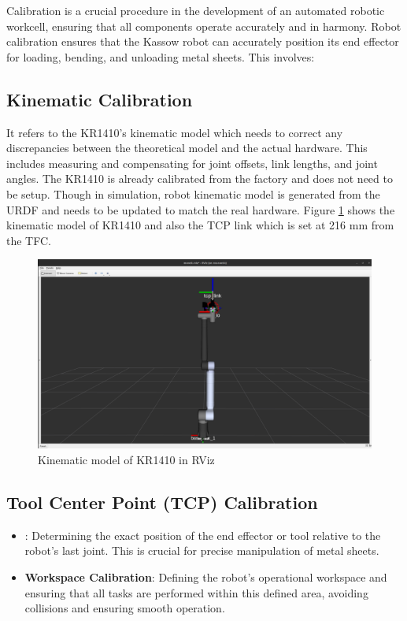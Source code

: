 
Calibration is a crucial procedure in the development of 
an automated robotic workcell, ensuring that all components
operate accurately and in harmony. Robot calibration ensures that the Kassow robot can accurately position its end effector for loading, bending, and unloading metal sheets. This involves:

\subsection{Kinematic Calibration}
\label{subsec:kinematic-calibration}
It refers to the KR1410's kinematic model which needs to correct any discrepancies between the theoretical model and the actual hardware. This includes measuring and compensating for joint offsets, link lengths, and joint angles. 
The KR1410 is already calibrated from the factory and does not need to be setup. Though in simulation, robot kinematic model is generated from the URDF and needs to be updated to match the real hardware. Figure \ref{fig:tcp} shows the kinematic model of KR1410 and also the TCP link which is set at 216 mm from the TFC.

\begin{figure}[h]
    \centering
    \includegraphics[width=1\textwidth]{6. System Integration and Testing/6.2 Calibration Procedures/tcp.PNG}
    \caption{Kinematic model of KR1410 in RViz}
    \label{fig:tcp}
\end{figure}

\subsection{Tool Center Point (TCP) Calibration}
\label{subsubsec:tcp-calibration}
\begin{itemize}
    \item \textbf{}: Determining the exact position of the end effector or tool relative to the robot’s last joint. This is crucial for precise manipulation of metal sheets.
    \item \textbf{Workspace Calibration}: Defining the robot's operational workspace and ensuring that all tasks are performed within this defined area, avoiding collisions and ensuring smooth operation.
\end{itemize}

